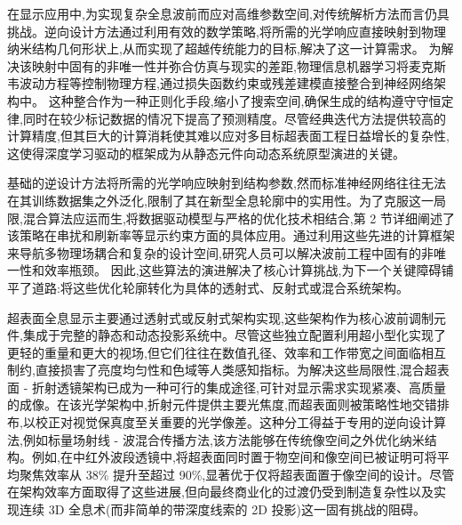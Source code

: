 在显示应用中,为实现复杂全息波前而应对高维参数空间,对传统解析方法而言仍具挑战。逆向设计方法通过利用有效的数学策略,将所需的光学响应直接映射到物理纳米结构几何形状上,从而实现了超越传统能力的目标,解决了这一计算需求。\citep{doi_10_1117_12_3099014_831c7349} \citep{doi_10_1364_ol_567547_28becc59} 为解决该映射中固有的非唯一性并弥合仿真与现实的差距,物理信息机器学习将麦克斯韦波动方程等控制物理方程,通过损失函数约束或残差建模直接整合到神经网络架构中。\citep{doi_10_1002_adpr_202300158_66d61883} 这种整合作为一种正则化手段,缩小了搜索空间,确保生成的结构遵守守恒定律,同时在较少标记数据的情况下提高了预测精度。尽管经典迭代方法提供较高的计算精度,但其巨大的计算消耗使其难以应对多目标超表面工程日益增长的复杂性,这使得深度学习驱动的框架成为从静态元件向动态系统原型演进的关键。\citep{doi_10_1088_1361_6439_ad3a72_72d60f33} \citep{doi_10_1002_adpr_202300158_66d61883} \citep{doi_10_71465_fapm546_bda368a5}

基础的逆设计方法将所需的光学响应映射到结构参数,然而标准神经网络往往无法在其训练数据集之外泛化,限制了其在新型全息轮廓中的实用性。为了克服这一局限,混合算法应运而生,将数据驱动模型与严格的优化技术相结合,第 2 节详细阐述了该策略在串扰和刷新率等显示约束方面的具体应用。通过利用这些先进的计算框架来导航多物理场耦合和复杂的设计空间,研究人员可以解决波前工程中固有的非唯一性和效率瓶颈。\citep{doi_10_1038_s41467_026_76714_x_8ca5d39b} 因此,这些算法的演进解决了核心计算挑战,为下一个关键障碍铺平了道路:将这些优化轮廓转化为具体的透射式、反射式或混合系统架构。\citep{doi_10_1021_acsphotonics_2c00968_06a2e96b} \citep{doi_10_1038_s41467_026_76714_x_8ca5d39b} \citep{doi_10_5757_asct_2023_32_6_141_32febf1c}

超表面全息显示主要通过透射式或反射式架构实现,这些架构作为核心波前调制元件,集成于完整的静态和动态投影系统中。尽管这些独立配置利用超小型化实现了更轻的重量和更大的视场,但它们往往在数值孔径、效率和工作带宽之间面临相互制约,直接损害了亮度均匀性和色域等人类感知指标。为解决这些局限性,混合超表面 - 折射透镜架构已成为一种可行的集成途径,可针对显示需求实现紧凑、高质量的成像。在该光学架构中,折射元件提供主要光焦度,而超表面则被策略性地交错排布,以校正对视觉保真度至关重要的光学像差。这种分工得益于专用的逆向设计算法,例如标量场射线 - 波混合传播方法,该方法能够在传统像空间之外优化纳米结构。例如,在中红外波段透镜中,将超表面同时置于物空间和像空间已被证明可将平均聚焦效率从 38\% 提升至超过 90\%,显著优于仅将超表面置于像空间的设计。尽管在架构效率方面取得了这些进展,但向最终商业化的过渡仍受到制造复杂性以及实现连续 3D 全息术(而非简单的带深度线索的 2D 投影)这一固有挑战的阻碍。\citep{doi_10_1515_nanoph_2025_0269_b999ce93} \citep{doi_10_1364_ao_516890_6221deea}

